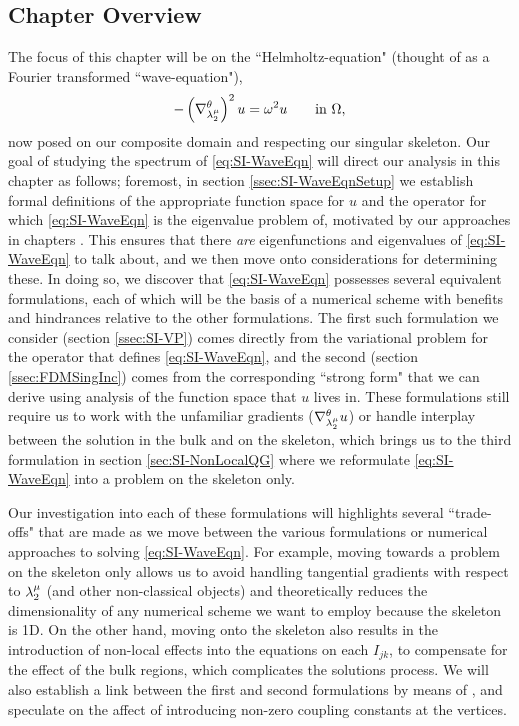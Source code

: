 \subsection{Chapter Overview} \label{ssec:SIOverview}
The focus of this chapter will be on the ``Helmholtz-equation" (thought of as a Fourier transformed ``wave-equation"),
\begin{align} \label{eq:SI-WaveEqn}
	-\left( \nabla^{\theta}_{\lambda_2^{\mu}} \right)^2 u = \omega^2 u \qquad\text{in } \Omega,
\end{align}
now posed on our composite domain and respecting our singular skeleton.
Our goal of studying the spectrum of \eqref{eq:SI-WaveEqn} will direct our analysis in this chapter as follows; foremost, in section \ref{ssec:SI-WaveEqnSetup} we establish formal definitions of the appropriate function space for $u$ and the operator for which \eqref{eq:SI-WaveEqn} is the eigenvalue problem of, motivated by our approaches in chapters .
This ensures that there \emph{are} eigenfunctions and eigenvalues of \eqref{eq:SI-WaveEqn} to talk about, and we then move onto considerations for determining these.
In doing so, we discover that \eqref{eq:SI-WaveEqn} possesses several equivalent formulations, each of which will be the basis of a numerical scheme with benefits and hindrances relative to the other formulations.
The first such formulation we consider (section \ref{ssec:SI-VP}) comes directly from the variational problem for the operator that defines \eqref{eq:SI-WaveEqn}, and the second (section \ref{ssec:FDMSingInc}) comes from the corresponding ``strong form" that we can derive using analysis of the function space that $u$ lives in.
These formulations still require us to work with the unfamiliar gradients ($\nabla^{\theta}_{\lambda_2^{\mu}}u$) or handle interplay between the solution in the bulk and on the skeleton, which brings us to the third formulation in section \ref{sec:SI-NonLocalQG} where we reformulate \eqref{eq:SI-WaveEqn} into a problem on the skeleton only.

Our investigation into each of these formulations will highlights several ``trade-offs" that are made as we move between the various formulations or numerical approaches to solving \eqref{eq:SI-WaveEqn}.
For example, moving towards a problem on the skeleton only allows us to avoid handling tangential gradients with respect to $\lambda_2^{\mu}$ (and other non-classical objects) and theoretically reduces the dimensionality of any numerical scheme we want to employ because the skeleton is 1D.
On the other hand, moving onto the skeleton also results in the introduction of non-local effects into the equations on each $I_{jk}$, to compensate for the effect of the bulk regions, which complicates the solutions process.
We will also establish a link between the first and second formulations by means of , and speculate on the affect of introducing non-zero coupling constants at the vertices.